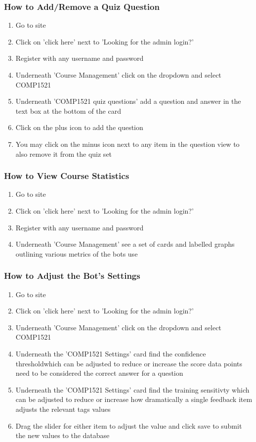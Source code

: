 \subsubsection{How to Add/Remove a Quiz Question}
\begin{enumerate}
	\item{Go to site}
	\item{Click on 'click here' next to 'Looking for the admin login?'}
	\item{Register with any username and password}
	\item{Underneath 'Course Management' click on the dropdown and select COMP1521}
	\item{Underneath 'COMP1521 quiz questions' add a question and answer in the text box at the bottom of the card}
	\item{Click on the plus icon to add the question}
	\item{You may click on the minus icon next to any item in the question view to also remove it from the quiz set}
\end{enumerate}

\subsubsection{How to View Course Statistics}
\begin{enumerate}
	\item{Go to site}
	\item{Click on 'click here' next to 'Looking for the admin login?'}
	\item{Register with any username and password}
	\item{Underneath 'Course Management' see a set of cards and labelled graphs outlining various metrics of the bots use}
\end{enumerate}

\subsubsection{How to Adjust the Bot's Settings}
\begin{enumerate}
	\item{Go to site}
	\item{Click on 'click here' next to 'Looking for the admin login?'}
	\item{Underneath 'Course Management' click on the dropdown and select COMP1521}
	\item{Underneath the 'COMP1521 Settings' card find the confidence thresholdwhich can be adjusted to reduce or increase the score data points need to be considered the correct answer for a question}
	\item{Underneath the 'COMP1521 Settings' card find the training sensitivty which can be adjusted to reduce or increase how dramatically a single feedback item adjusts the relevant tags values}
	\item{Drag the slider for either item to adjust the value and click save to submit the new values to the database}
\end{enumerate}


